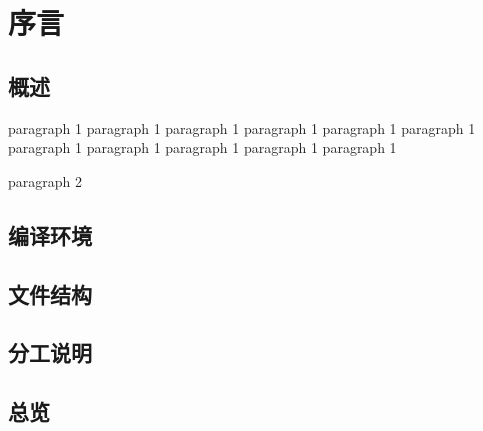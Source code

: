 \documentclass{article}
\begin{document}
\newpage



\section*{序言}

\subsection*{概述}
\par paragraph 1 paragraph 1 paragraph 1 paragraph 1 paragraph 1 paragraph 1 paragraph 1 paragraph 1 paragraph 1 paragraph 1 paragraph 1 
\par paragraph 2

\subsection*{编译环境}

\subsection*{文件结构}

\subsection*{分工说明}

\subsection*{总览}
\end{document}
